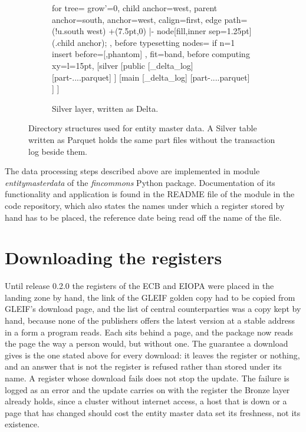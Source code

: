 \begin{figure}[h!]
\begin{subfigure}[t]{0.32\textwidth}
		\centering
		\begin{forest}
			for tree={
				grow'=0,
				child anchor=west,
				parent anchor=south,
				anchor=west,
				calign=first,
				edge path={
					\noexpand{}
					(!u.south west) +(7.5pt,0) |- node[fill,inner sep=1.25pt] {} (.child anchor);
				},
				before typesetting nodes={
					if n=1
					{insert before={[,phantom]}}
					{}
				},
				fit=band,
				before computing xy={l=15pt},
			}
			[silver
			[public
			[\_delta\_log]
			[part-....parquet]
			]
			[main
			[\_delta\_log]
			[part-....parquet]
			]
			]
		\end{forest}
		\caption{Silver layer, written as Delta.}
	\end{subfigure}
	\caption{Directory structures used for entity master data. A Silver table written as Parquet holds the same part files without the transaction log beside them.\label{fig:dirstruct_entitymasterdata}}
\end{figure}

The data processing steps described above are implemented in module \emph{entitymasterdata} of the \emph{fincommons} Python package. Documentation of its functionality and application is found in the README file of the module in the code repository, which also states the names under which a register stored by hand has to be placed, the reference date being read off the name of the file.

\section{Downloading the registers}\label{sec:entitymasterdata-downloads}

Until release 0.2.0 the registers of the ECB and EIOPA were placed in the landing zone by hand, the link of the GLEIF golden copy had to be copied from GLEIF's download page, and the list of central counterparties was a copy kept by hand, because none of the publishers offers the latest version at a stable address in a form a program reads. Each sits behind a page, and the package now reads the page the way a person would, but without one. The guarantee a download gives is the one stated above for every download: it leaves the register or nothing, and an answer that is not the register is refused rather than stored under its name. A register whose download fails does not stop the update. The failure is logged as an error and the update carries on with the register the Bronze layer already holds, since a cluster without internet access, a host that is down or a page that has changed should cost the entity master data set its freshness, not its existence.

